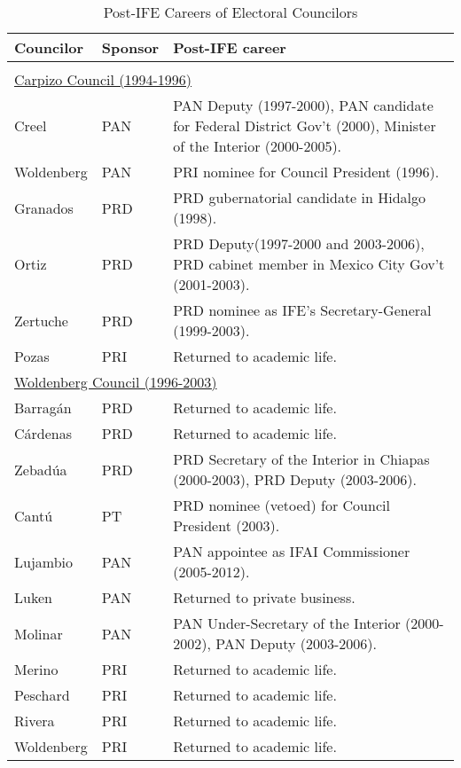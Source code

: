 \documentclass[12 pt]{article}
\begin{document}
\begin{table}
\caption{Post-IFE Careers of Electoral Councilors}\label{T:postife}
\begin{center}
\begin{tabular}{llp{3in}}
\hline
Councilor & Sponsor & Post-IFE career \\ \hline \\ [-1.5ex]
\multicolumn{3}{l}{\underline{Carpizo Council (1994-1996)}}\\  [1.2ex]
Creel       & PAN & PAN Deputy (1997-2000), PAN candidate for Federal District Gov't (2000), Minister of the Interior (2000-2005). \\ [0.5ex]
Woldenberg  & PAN & PRI nominee for Council President (1996). \\ [0.5ex]
Granados    & PRD & PRD gubernatorial candidate in Hidalgo (1998). \\ [0.5ex]
Ortiz       & PRD & PRD Deputy(1997-2000 and 2003-2006), PRD cabinet member in Mexico City Gov't (2001-2003). \\ [0.5ex]
Zertuche    & PRD & PRD nominee as IFE's Secretary-General (1999-2003). \\ [0.5ex]
Pozas       & PRI & Returned to academic life. \\ [1.2ex]
\multicolumn{3}{l}{\underline{Woldenberg Council (1996-2003)}}\\ [1.2ex]
Barrag\'an  & PRD & Returned to academic life. \\ [0.5ex]
C\'ardenas  & PRD & Returned to academic life. \\ [0.5ex]
Zebad\'ua   & PRD & PRD Secretary of the Interior in Chiapas (2000-2003), PRD Deputy (2003-2006). \\ [0.5ex]
Cant\'u     & PT  & PRD nominee (vetoed) for Council President (2003). \\ [0.5ex]
Lujambio    & PAN & PAN appointee as IFAI Commissioner (2005-2012). \\ [0.5ex]
Luken       & PAN & Returned to private business. \\ [0.5ex]
Molinar     & PAN & PAN Under-Secretary of the Interior (2000-2002), PAN Deputy (2003-2006). \\ [0.5ex]
Merino      & PRI & Returned to academic life. \\ [0.5ex]
Peschard    & PRI & Returned to academic life. \\ [0.5ex]
Rivera      & PRI & Returned to academic life. \\ [0.5ex]
Woldenberg  & PRI & Returned to academic life. \\ \hline
\end{tabular}
\end{center}
\end{table}
\end{document}
